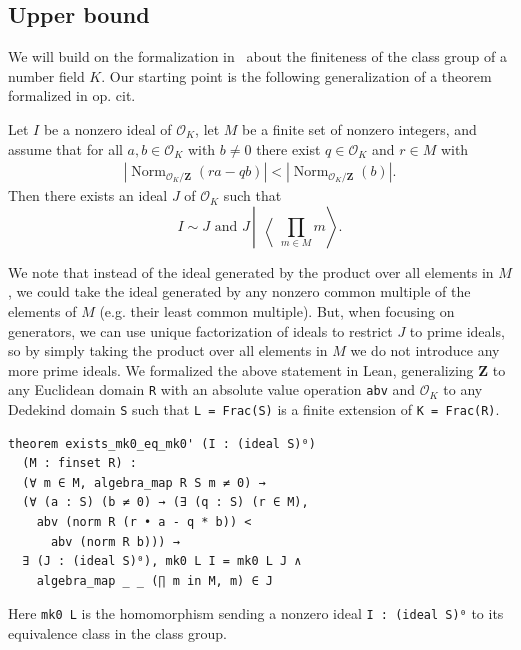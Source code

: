 \documentclass[sigplan,10pt,nonacm,
screen]{acmart} \settopmatter{printfolios=true,printccs=false,printacmref=false}
\newcommand{\ZZ}{\mathbf{Z}}
\newcommand{\OK}{\mathcal{O}_K}
\DeclareMathOperator{\Norm}{Norm}
\begin{document}
\subsection{Upper bound} \label{sec:upper bound}

We will build on the formalization in~\cite[Section 8.2]{baanen_formalization_2021} about the finiteness of the class group of a number field $K$.
Our starting point is the following generalization of a theorem formalized in op. cit.

\begin{theorem}\label{thm main class group divisibility}
Let $I$ be a nonzero ideal of $\OK$,  let $M$ be a finite set of nonzero integers, and assume that
for all $a,b \in \mathcal{O}_K$ with $b\not= 0$ there exist $q \in \OK$ and $r \in M$ with
\begin{align}
  |\Norm_{\OK/\ZZ}(ra-qb)| < |\Norm_{\OK/\ZZ}(b)|. \label{eqn:div-with-remainder}
\end{align}
Then there exists an ideal $J$ of $\OK$ such that
\[I \sim J \text{ and } J \,\left|\, \middle\langle \prod_{m \in M} m \right\rangle.\]
\end{theorem}

We note that instead of the ideal generated by the product over all elements in $M$, we could take the ideal generated by any nonzero common multiple of the elements of $M$ (e.g. their least common multiple).
But, when focusing on generators, we can use unique factorization of ideals to restrict $J$ to prime ideals,
so by simply taking the product over all elements in $M$ we do not introduce any more prime ideals.
We formalized the above statement in Lean,
generalizing $\ZZ$ to any Euclidean domain \lstinline{R} with an absolute value operation \lstinline{abv}
and $\OK$ to any Dedekind domain \lstinline{S} such that \lstinline{L = Frac(S)} is a finite extension of \lstinline{K = Frac(R)}.

\begin{lstlisting}
theorem exists_mk0_eq_mk0' (I : (ideal S)⁰)
  (M : finset R) :
  (∀ m ∈ M, algebra_map R S m ≠ 0) →
  (∀ (a : S) (b ≠ 0) → (∃ (q : S) (r ∈ M),
    abv (norm R (r • a - q * b)) <
      abv (norm R b))) →
  ∃ (J : (ideal S)⁰), mk0 L I = mk0 L J ∧
    algebra_map _ _ (∏ m in M, m) ∈ J
\end{lstlisting}
Here \lstinline{mk0 L} is the homomorphism sending a nonzero ideal \lstinline{I : (ideal S)⁰} to its equivalence class in the class group.
\end{document}
